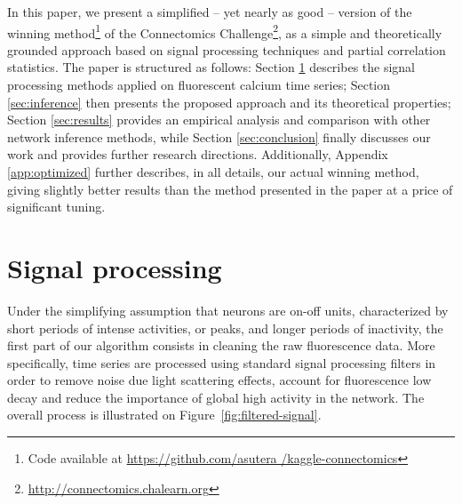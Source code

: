 \documentclass[wcp]{jmlr}
\begin{document}
In this paper, we present a simplified -- yet nearly as good -- version of the
winning method\footnote{Code available at \url{https://github.com/asutera
/kaggle-connectomics}} of the Connectomics
Challenge\footnote{\url{http://connectomics.chalearn.org}}, as a simple and
theoretically grounded approach based on signal processing techniques and
partial correlation statistics. The paper is structured as follows: Section
\ref{sec:filter} describes the signal processing methods applied on fluorescent
calcium time series; Section \ref{sec:inference} then presents the proposed
approach and its theoretical properties; Section \ref{sec:results} provides an
empirical analysis and comparison with other network inference methods, while
Section \ref{sec:conclusion} finally discusses our work and provides further
research directions. Additionally, Appendix \ref{app:optimized} further
describes, in all details, our actual winning method, giving slightly better
results than the method presented in the paper at a price of significant
tuning.


\section{Signal processing} \label{sec:filter}

Under the simplifying assumption that neurons are on-off units, characterized
by short periods of intense activities, or peaks, and longer periods of
inactivity, the first part of our algorithm consists in cleaning the raw
fluorescence data. More specifically, time series are processed using standard
signal processing filters in order to remove noise due light scattering
effects, account for fluorescence  low decay and reduce the importance of
global high activity in the network. The overall process is illustrated on
Figure~\ref{fig:filtered-signal}.
\end{document}

